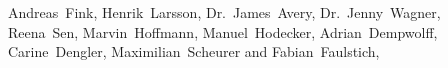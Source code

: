 Andreas~Fink,
Henrik~Larsson,
Dr.~James~Avery,
Dr.~Jenny~Wagner,
Reena~Sen,
Marvin~Hoffmann,
Manuel~Hodecker,
Adrian~Dempwolff,
Carine~Dengler,
Maximilian~Scheurer and
Fabian~Faulstich,